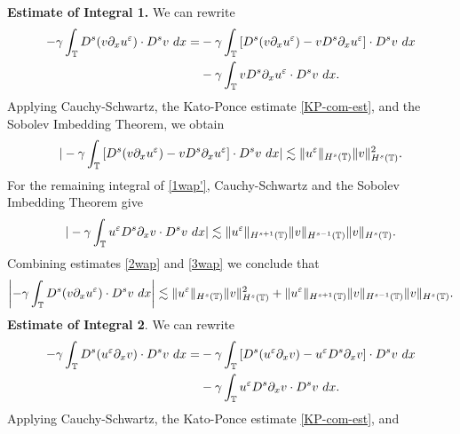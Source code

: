 \textbf{Estimate of Integral 1.} We can rewrite
%
%
\begin{equation}
\begin{split}
-\gamma \int_{\mathbb{T}} D^s (v \partial_x u^\varepsilon ) \cdot D^s v \
dx = & -\gamma \int_{\mathbb{T}} \left[ D^s(v \partial_x u^\varepsilon) - v D^s
\partial_x u^\varepsilon \right] \cdot D^s v \ dx
\\
& -  \gamma \int_{\mathbb{T}} v D^s \partial_x u^\varepsilon \cdot D^s v \ dx.
\label{1wap'}
\end{split}
\end{equation}
%
%
%
%
%
%
Applying Cauchy-Schwartz, the Kato-Ponce estimate \eqref{KP-com-est}, and the Sobolev 
Imbedding Theorem, we obtain 
%
%
%
%
\begin{equation}
\begin{split}
| -\gamma \int_{\mathbb{T}} \left[ D^s(v \partial_x u^\varepsilon ) - v D^s
\partial_x u^\varepsilon \right] \cdot D^s v \ dx |
\lesssim \|u^\varepsilon \|_{H^s(\mathbb{T})} \|v\|_{H^s(\mathbb{T})}^2.
\label{2wap}
\end{split}
\end{equation}
%
%
For the remaining integral of \eqref{1wap'}, Cauchy-Schwartz and the Sobolev 
Imbedding Theorem give
%
%
%
\begin{equation}
\begin{split}
| - \gamma \int_{\mathbb{T}} u^\varepsilon D^s \partial_x v \cdot D^s v \ dx |
\lesssim \|u^\varepsilon \|_{H^{s+1}(\mathbb{T})} \|v\|_{H^{s-1}(\mathbb{T})}
\|v\|_{H^s(\mathbb{T})}.
\label{3wap}
\end{split}
\end{equation}
%
%
Combining estimates \eqref{2wap} and \eqref{3wap} we conclude that
%
%
\begin{equation}
\begin{split}
\left | -\gamma \int_{\mathbb{T}} D^s (v \partial_x u^\varepsilon ) \cdot D^s v \
dx \right | \lesssim \|u^\varepsilon \|_{H^s(\mathbb{T})} \|v\|_{H^s(\mathbb{T})}^2 + \|u^\varepsilon 
\|_{H^{s+1}(\mathbb{T})} \|v\|_{H^{s-1}(\mathbb{T})}
\|v\|_{H^s(\mathbb{T})}.
\label{4wap}
\end{split}
\end{equation}
%
%
%
\textbf{Estimate of Integral 2}. We can rewrite
%
%
\begin{equation}
\begin{split}
-\gamma \int_{\mathbb{T}} D^s (u^\varepsilon \partial_x v) \cdot D^s v \
dx
= & -\gamma \int_{\mathbb{T}} \left[ D^s(u^\varepsilon \partial_x v) - u^\varepsilon D^s
\partial_x v \right] \cdot D^s v \ dx
\\
& -  \gamma \int_{\mathbb{T}} u^\varepsilon D^s \partial_x v \cdot D^s v \ dx.
\label{1wa'}
\end{split}
\end{equation}
%
%
Applying Cauchy-Schwartz, the Kato-Ponce estimate \eqref{KP-com-est}, and 
